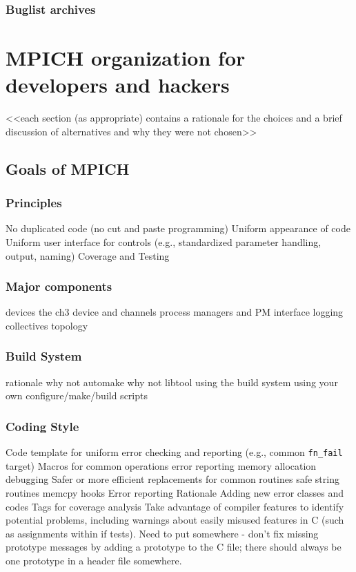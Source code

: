 \documentclass{report}
\begin{document}
\section{Buglist archives}


\part{MPICH organization for developers and hackers}


    <<each section (as appropriate) contains a rationale for the choices and a brief discussion of alternatives and why they were not chosen>>

\chapter{Goals of MPICH}


\section{Principles}
         No duplicated code (no cut and paste programming) 
         Uniform appearance of code
         Uniform user interface for controls (e.g., standardized parameter handling, output, naming)
         Coverage and Testing

\section{Major components}
         devices
              the ch3 device and channels
         process managers and PM interface
         logging
         collectives
         topology

\section{Build System}
         rationale
              why not automake
              why not libtool
         using the build system
         using your own configure/make/build scripts

\section{Coding Style}
         Code template for uniform error checking and reporting (e.g.,
         common \texttt{fn\_fail} target) 
         Macros for common operations
              error reporting
              memory allocation
              debugging
         Safer or more efficient replacements for common routines
              safe string routines
              memcpy hooks
         Error reporting
              Rationale
               Adding new error classes and codes
         Tags for coverage analysis
         Take advantage of compiler features to identify potential
         problems, including warnings about easily misused features in
         C (such as assignments within if tests).  
	 Need to put somewhere - don't fix missing prototype messages
         by adding a prototype to the C file; there should always be
         one prototype in a header file somewhere.
\end{document}
